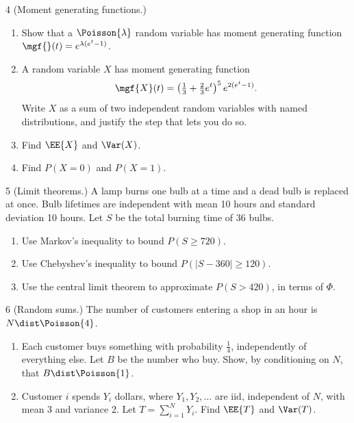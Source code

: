 \documentclass[11pt]{article}
\begin{document}
\begin{problem}{4}
  (Moment generating functions.)
  \begin{enumerate}
    \item[(a)] Show that a $\Poisson{\lambda}$ random variable has moment generating
      function $\mgf{}(t) = e^{\lambda(e^t - 1)}$.
    \item[(b)] A random variable $X$ has moment generating function
      \[
        \mgf{X}(t) = \left(\tfrac{1}{3} + \tfrac{2}{3}e^{t}\right)^{5} e^{2(e^{t} - 1)}.
      \]
      Write $X$ as a sum of two independent random variables with named
      distributions, and justify the step that lets you do so.
    \item[(c)] Find $\EE{X}$ and $\Var(X)$.
    \item[(d)] Find $P(X = 0)$ and $P(X = 1)$.
  \end{enumerate}
\end{problem}
\vfill\newpage

\begin{problem}{5}
  (Limit theorems.) A lamp burns one bulb at a time and a dead bulb is replaced
  at once. Bulb lifetimes are independent with mean 10 hours and standard
  deviation 10 hours. Let $S$ be the total burning time of 36 bulbs.
  \begin{enumerate}
    \item[(a)] Use Markov's inequality to bound $P(S \ge 720)$.
    \item[(b)] Use Chebyshev's inequality to bound $P(|S - 360| \ge 120)$.
    \item[(c)] Use the central limit theorem to approximate $P(S > 420)$, in terms
      of $\Phi$.
  \end{enumerate}
\end{problem}
\vfill\newpage

\begin{problem}{6}
  (Random sums.) The number of customers entering a shop in an hour is
  $N \dist \Poisson{4}$.
  \begin{enumerate}
    \item[(a)] Each customer buys something with probability $\tfrac14$,
      independently of everything else. Let $B$ be the number who buy. Show, by
      conditioning on $N$, that $B \dist \Poisson{1}$.
    \item[(b)] Customer $i$ spends $Y_i$ dollars, where $Y_1, Y_2, \ldots$ are iid,
      independent of $N$, with mean 3 and variance 2. Let
      $T = \sum_{i=1}^{N} Y_i$. Find $\EE{T}$ and $\Var(T)$.
  \end{enumerate}
\end{problem}
\vfill\newpage
\end{document}
